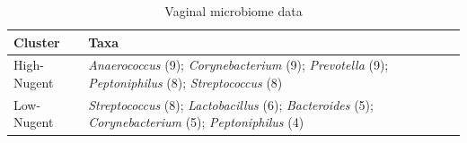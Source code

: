 \begin{table}[ht]
\centering
\caption{Vaginal microbiome data}
\label{tab:vaginal_taxa}
\begin{tabular}{p{1.2cm}p{12cm}}
\toprule
Cluster & Taxa \\
\midrule
High-Nugent & \textit{Anaerococcus} (9); \textit{Corynebacterium} (9); \textit{Prevotella} (9); \textit{Peptoniphilus} (8); \textit{Streptococcus} (8) \\
\addlinespace
Low-Nugent & \textit{Streptococcus} (8); \textit{Lactobacillus} (6); \textit{Bacteroides} (5); \textit{Corynebacterium} (5); \textit{Peptoniphilus} (4) \\
\bottomrule
\end{tabular}
\end{table}